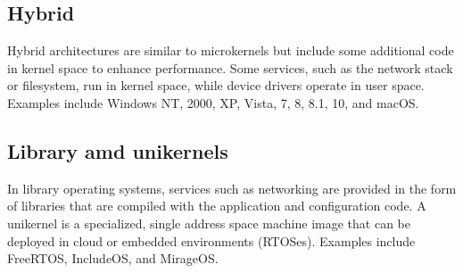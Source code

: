\subsection{Hybrid}
Hybrid architectures are similar to microkernels but include some additional code in kernel space to enhance performance.
Some services, such as the network stack or filesystem, run in kernel space, while device drivers operate in user space. 
Examples include Windows NT, 2000, XP, Vista, 7, 8, 8.1, 10, and macOS.

\subsection{Library amd unikernels}
In library operating systems, services such as networking are provided in the form of libraries that are compiled with the application and configuration code. 
A unikernel is a specialized, single address space machine image that can be deployed in cloud or embedded environments (RTOSes).
Examples include FreeRTOS, IncludeOS, and MirageOS.